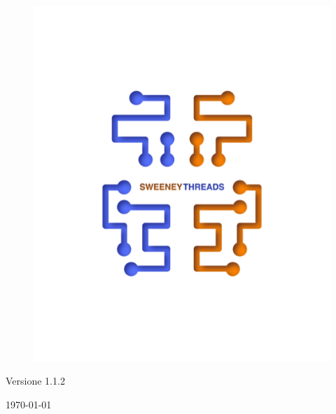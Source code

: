 \documentclass[a4paper]{report}
\begin{document}
\begin{titlepage}
		\begin{figure}[H]
			\centering
			\includegraphics[scale=0.8]{sweeney.png}
		\end{figure}
		\begin{center}
			Versione 1.1.2
		\end{center}
		{\large \today}\\[3cm] 
		\vfill  
	\end{titlepage}
	
	
	\tableofcontents
	
\end{document}
